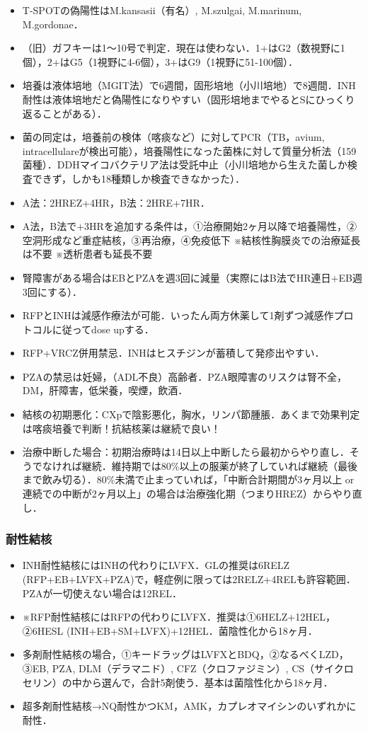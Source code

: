 \begin{itemize}
\item T-SPOTの偽陽性はM.kansasii（有名）, M.szulgai, M.marinum, M.gordonae．
\item （旧）ガフキーは1〜10号で判定．現在は使わない．1+はG2（数視野に1個），2+はG5（1視野に4-6個），3+はG9（1視野に51-100個）．
\item 培養は液体培地（MGIT法）で6週間，固形培地（小川培地）で8週間．INH耐性は液体培地だと偽陽性になりやすい（固形培地までやるとSにひっくり返ることがある）．
\item 菌の同定は，培養前の検体（喀痰など）に対してPCR（TB，avium, intracellulareが検出可能），培養陽性になった菌株に対して質量分析法（159菌種）．DDHマイコバクテリア法は受託中止（小川培地から生えた菌しか検査できず，しかも18種類しか検査できなかった）．
\item A法：2HREZ+4HR，B法：2HRE+7HR．
\item A法，B法で+3HRを追加する条件は，①治療開始2ヶ月以降で培養陽性，②空洞形成など重症結核，③再治療，④免疫低下 ※結核性胸膜炎での治療延長は不要 ※透析患者も延長不要
\item 腎障害がある場合はEBとPZAを週3回に減量（実際にはB法でHR連日+EB週3回にする）．
\item RFPとINHは減感作療法が可能．いったん両方休薬して1剤ずつ減感作プロトコルに従ってdose upする．
\item RFP+VRCZ併用禁忌．INHはヒスチジンが蓄積して発疹出やすい．
\item PZAの禁忌は妊婦，（ADL不良）高齢者．PZA眼障害のリスクは腎不全，DM，肝障害，低栄養，喫煙，飲酒．
\item 結核の初期悪化：CXpで陰影悪化，胸水，リンパ節腫脹．あくまで効果判定は喀痰培養で判断！抗結核薬は継続で良い！
\item 治療中断した場合：初期治療時は14日以上中断したら最初からやり直し．そうでなければ継続．維持期では80\%以上の服薬が終了していれば継続（最後まで飲み切る）．80\%未満で止まっていれば，「中断合計期間が3ヶ月以上 or 連続での中断が2ヶ月以上」の場合は治療強化期（つまりHREZ）からやり直し．
\end{itemize}


\subsubsection{耐性結核}

\begin{itemize}
\item INH耐性結核にはINHの代わりにLVFX．GLの推奨は6RELZ (RFP+EB+LVFX+PZA)で，軽症例に限っては2RELZ+4RELも許容範囲．PZAが一切使えない場合は12REL．
\item ※RFP耐性結核にはRFPの代わりにLVFX．推奨は①6HELZ+12HEL，②6HESL (INH+EB+SM+LVFX)+12HEL．菌陰性化から18ヶ月．
\item 多剤耐性結核の場合，①キードラッグはLVFXとBDQ，②なるべくLZD，③EB, PZA, DLM（デラマニド）, CFZ（クロファジミン）, CS（サイクロセリン）の中から選んで，合計5剤使う．基本は菌陰性化から18ヶ月．
\item 超多剤耐性結核→NQ耐性かつKM，AMK，カプレオマイシンのいずれかに耐性．
\end{itemize}


